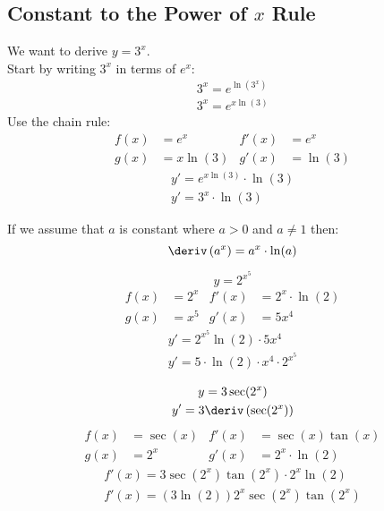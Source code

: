 \subsection{Constant to the Power of \texorpdfstring{$x$}{x} Rule}
We want to derive $y = 3^x$. \\
Start by writing $3^x$ in terms of $e^x$:
\begin{gather*}
    3^x = e^{\ln(3^x)} \\
    3^x = e^{x\ln(3)}
\end{gather*}
Use the chain rule:
\begin{align*}
    f(x) &= e^x     & f'(x) &= e^x \\
    g(x) &= x\ln(3) & g'(x) &= \ln(3)
\end{align*}
\begin{gather*}
    y' = e^{x\ln(3)} \cdot \ln(3) \\
    y' = 3^x \cdot \ln(3)
\end{gather*}
\begin{theorem}
    If we assume that $a$ is constant where $a > 0$ and $a \neq 1$ then:
    \begin{equation}
        \deriv \left(a^x\right) = a^x \cdot \ln(a)
    \end{equation}
\end{theorem}
\begin{example}
    \begin{equation*}
        y = 2^{x^5}
    \end{equation*}
    \begin{align*}
        f(x) &= 2^x & f'(x) &= 2^x \cdot \ln(2) \\
        g(x) &= x^5 & g'(x) &= 5x^4
    \end{align*}
    \begin{gather*}
        y' = 2^{x^5} \ln(2) \cdot 5x^4 \\
        y' = 5 \cdot \ln(2) \cdot x^4 \cdot 2^{x^5}
    \end{gather*}
\end{example}
\begin{example}
    \begin{gather*}
        y = 3 \sec(2^x) \\
        y' = 3 \deriv \left(\sec(2^x)\right)
    \end{gather*}
    \begin{align*}
        f(x) &= \sec(x) & f'(x) &= \sec(x)\tan(x) \\
        g(x) &= 2^x     & g'(x) &= 2^x \cdot \ln(2)
    \end{align*}
    \begin{gather*}
        f'(x) = 3 \sec(2^x) \tan(2^x) \cdot 2^x \ln(2) \\
        f'(x) = \left(3 \ln(2)\right)2^x \sec(2^x) \tan(2^x)
    \end{gather*}
\end{example}
